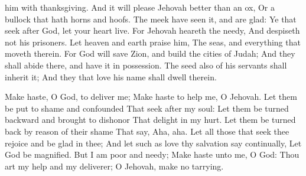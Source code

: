 him with thanksgiving.  And it will please Jehovah better than an ox, Or a bullock that hath horns and hoofs.  The meek have seen it, and are glad: Ye that seek after God, let your heart live.  For Jehovah heareth the needy, And despiseth not his prisoners.  Let heaven and earth praise him, The seas, and everything that moveth therein.  For God will save Zion, and build the cities of Judah; And they shall abide there, and have it in possession.  The seed also of his servants shall inherit it; And they that love his name shall dwell therein. 

Make haste, O God, to deliver me; Make haste to help me, O Jehovah.  Let them be put to shame and confounded That seek after my soul: Let them be turned backward and brought to dishonor That delight in my hurt.  Let them be turned back by reason of their shame That say, Aha, aha.  Let all those that seek thee rejoice and be glad in thee; And let such as love thy salvation say continually, Let God be magnified.  But I am poor and needy; Make haste unto me, O God: Thou art my help and my deliverer; O Jehovah, make no tarrying. 

